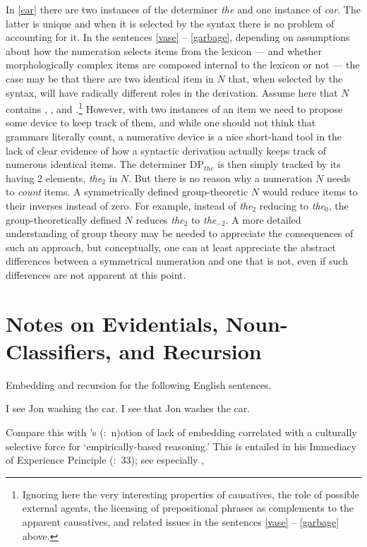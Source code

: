 \documentclass[11pt]{article}
\newcommand{\pgposscitet}[2]{\citeauthor{#1}'s (\citeyear{#1}:~#2)}
\newcommand{\pgcitet}[2]{\citeauthor{#1} (\citeyear{#1}:~#2)}
\begin{document}
In \ref{car} there are two instances of the determiner \textsl{the} and one instance of \textsl{car}. The latter is unique and when it is selected by the syntax there is no problem of accounting for it. In the sentences \ref{vase} -- \ref{garbage}, depending on assumptions about how the numeration selects items from the lexicon --- and whether morphologically complex items are composed internal to the lexicon or not --- the case may be that there are two identical item in $N$ that, when selected by the syntax, will have radically different roles in the derivation. Assume here that $N$ contains , , and .\footnote{Ignoring here the very interesting properties of causatives, the role of possible external agents, the licensing of prepositional phrases as complements to the apparent causatives, and related issues in the sentences \ref{vase} -- \ref{garbage} above.} However, with two instances of an item we need to propose some device to keep track of them, and while one should not think that grammars literally count, a numerative device is a nice short-hand tool in the lack of clear evidence of how a syntactic derivation actually keeps track of numerous identical items. The determiner DP$_{the}$ is then simply tracked by its having 2 elements, \textsl{the}$_{2}$ in $N$. But there is no reason why a numeration $N$ needs to \textsl{count} items. A symmetrically defined group-theoretic $N$ would reduce items to their inverses instead of zero. For example, instead of \textsl{the}$_{2}$ reducing to \textsl{the}$_{0}$, the group-theoretically defined $N$ reduces \textsl{the}$_{2}$ to \textsl{the}$_{-2}$. A more detailed understanding of group theory may be needed to appreciate the consequences of such an approach, but conceptually, one can at least appreciate the abstract differences between a symmetrical numeration and one that is not, even if such differences are not apparent at this point.       

\section{Notes on Evidentials, Noun-Classifiers, and Recursion}
Embedding and recursion for the following English sentences.

\begin{exe}
\ex I see Jon washing the car.\label{seex}
\ex I see that Jon washes the car.\label{seethat} 
\end{exe}

Compare this with \pgposscitet{everett09response} notion of lack of embedding correlated with a culturally selective force for `empirically-based reasoning.' This is entailed in his Immediacy of Experience Principle \pgcitet{everett09response}{33}; see especially \cite{everett05piraha,everett06reply,everett07replynevins},
\end{document}
